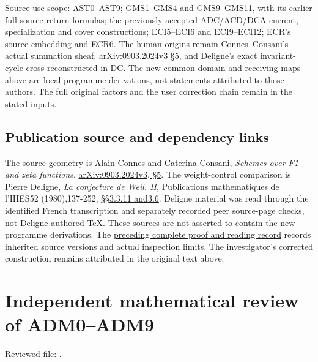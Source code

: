 Source-use scope: AST0--AST9; GMS1--GMS4 and GMS9--GMS11, with its
earlier full source-return formulas; the previously accepted ADC/ACD/DCA
current, specialization and cover constructions; ECI5--ECI6 and
ECI9--ECI12; ECR's source embedding and ECR6. The human origins remain
Connes--Consani's actual summation sheaf, arXiv:0903.2024v3 §5, and
Deligne's exact invariant-cycle cross reconstructed in DC. The new
common-domain and receiving maps above are local programme derivations,
not statements attributed to those authors. The full original factors
and the user correction chain remain in the stated inputs.

\section{Publication source and dependency
links}\label{publication-source-and-dependency-links}

The source geometry is Alain Connes and Caterina Consani, \emph{Schemes
over F1 and zeta functions},
\href{https://arxiv.org/abs/0903.2024v3}{arXiv:0903.2024v3, §5}. The
weight-control comparison is Pierre Deligne, \emph{La conjecture de
Weil. II}, Publications mathematiques de l'IHES52 (1980),137-252,
\href{https://www.numdam.org/item/PMIHES_1980__52__137_0/}{§§3.3.11
and3.6}. Deligne material was read through the identified French
transcription and separately recorded peer source-page checks, not
Deligne-authored TeX. These sources are not asserted to contain the new
programme derivations. The
\href{https://github.com/KokunoYumeto/zeta-function-research-reader/blob/36a82ecca98addb8a98b48204e349737856c7223/workbenches/splitzero-tandem/continuations/20260924-cohomology-weight-and-character-lifts/BUILD_AND_REVIEW.md}{preceding
complete proof and reading record} records inherited source versions and
actual inspection limits. The investigator's corrected construction
remains attributed in the original text above.

\chapter{Independent mathematical review of
ADM0--ADM9}\label{independent-mathematical-review-of-adm0adm9}

Reviewed file:
\href{https://github.com/KokunoYumeto/zeta-function-research-reader/blob/main/workbenches/splitzero-tandem/continuations/20260925-full-source-tensor-and-original-divisor/identity/ACTUAL_DEFECT_MULTIPLIER_DOMAIN.md}{}.

